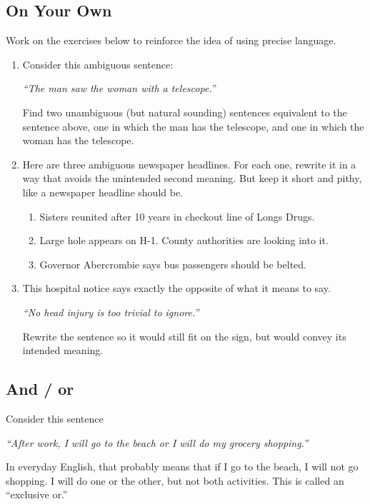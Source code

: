 \subsection*{On Your Own}
Work on the exercises below to reinforce the idea of using precise language.
\begin{enumerate}
\item
Consider this ambiguous sentence:
\begin{center}
\emph{``The man saw
the woman with a telescope.''} 
\end{center}
Find two unambiguous (but natural sounding) sentences equivalent to the sentence above, one in which the
 man has the telescope, and one in which  the woman
has the telescope.
 
 
 \item
Here are three ambiguous newspaper headlines.  For each one, rewrite it in a way that avoids the unintended second meaning.  But keep it short and pithy, like a newspaper headline should be.

\begin{enumerate}
\item
Sisters reunited after 10 years in checkout line of Longs Drugs.
\item
Large hole appears on H-1.  County authorities are looking into it.
\item
Governor Abercrombie says bus passengers should be belted.

\end{enumerate}


 \item
This hospital notice says exactly the opposite of what it means to say.
 \begin{center}
\emph{``No head injury is too trivial to ignore.''} 
\end{center}
Rewrite the sentence so it would still fit on the sign, but would convey its intended meaning.



\end{enumerate}


\subsection{And / or}
Consider this sentence 
\begin{center}
\emph{``After work, I will go to the beach or I will do my grocery shopping.''}
\end{center}
In everyday English, that probably means that if I go to the beach, I will not go shopping.  I will do one or the other, but not both activities.  This is called an ``exclusive or.''

